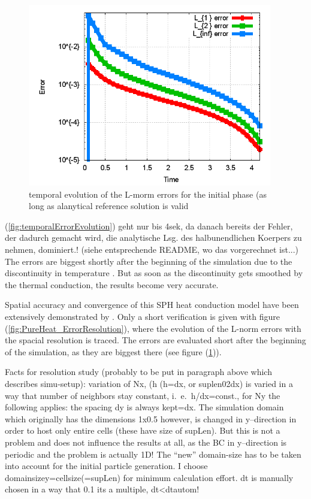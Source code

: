 \documentclass{report}
\begin{document}
\begin{figure}[h]  
  \label{fig:PureHeat_temporalErrorEvolution}
  \centering
  \includegraphics[width=0.95\textwidth]{Graphics/results/PureHeatConduction/temporalErrEvolution}
  \caption{temporal evolution of the L-morm errors for the initial phase (as long as alanytical reference solution is valid}
\end{figure}

(\ref{fig:temporalErrorEvolution}) geht nur bis 4sek, da danach bereits der Fehler, der dadurch gemacht wird, die analytische Lsg. des halbunendlichen Koerpers zu nehmen, dominiert.! (siehe entsprechende README, wo das vorgerechnet ist...)
The errors are biggest shortly after the beginning of the simulation due to the discontinuity in temperature \cite{Cleary1999}. But as soon as the discontinuity gets smoothed by the thermal conduction, the results become very accurate.

Spatial accuracy and convergence of this SPH heat conduction model have been extensively demonstrated by \cite{Cleary1999}. Only a short verification is given with figure (\ref{fig:PureHeat_ErrorResolution}), where the evolution of the L-norm errors with the spacial resolution is traced. The errors are evaluated short after the beginning of the simulation, as they are biggest there (see figure (\ref{fig:PureHeat_temporalErrorEvolution})).

Facts for resolution study (probably to be put in paragraph above which describes simu-setup): variation of Nx, (h (h=dx, or suplen02dx) is varied in a way that number of neighbors stay constant, i.\ e.\ h/dx=const., 
for Ny the following applies: the spacing dy is always kept=dx. The simulation domain which originally has the dimensions 1x0.5 however, is changed in y--direction in order to host only entire cells (these have size of supLen).
But this is not a problem and does not influence the results at all, as the BC in y--direction is periodic and the problem is actually 1D!
The ``new'' domain-size has to be taken into account for the initial particle generation. I choose domainsizey=cellsize(=supLen) for minimum calculation effort.
dt is manually chosen in a way that 0.1 its a multiple, dt<dtautom!
\end{document}
